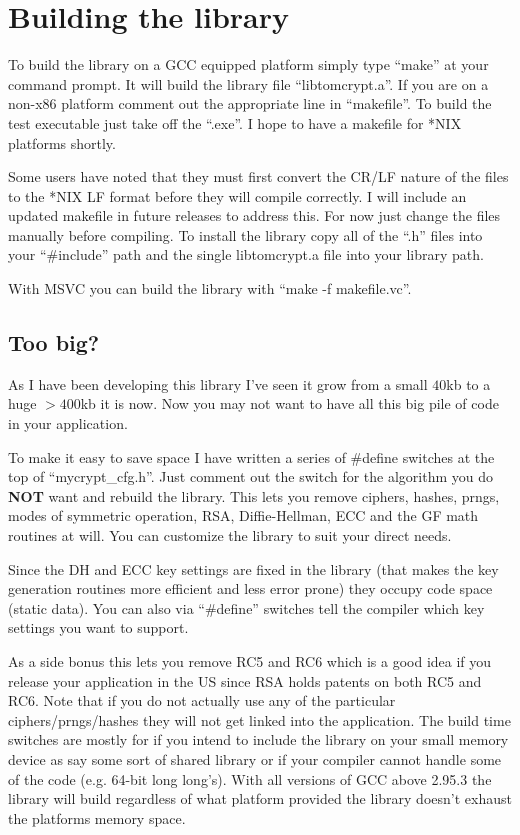 \documentclass{book}
\begin{document}
\section{Building the library}

To build the library on a GCC equipped platform simply type ``make'' at your command prompt.  It will build the library
file ``libtomcrypt.a''.  If you are on a non-x86 platform comment out the appropriate line in ``makefile''.  To build the
test executable just take off the ``.exe''.  I hope to have a makefile for *NIX platforms shortly.

Some users have noted that they must first convert the CR/LF nature of the files to the *NIX LF format before they will
compile correctly.  I will include an updated makefile in future releases to address this.  For now just change the files
manually before compiling.  To install the library copy all of the ``.h'' files into your ``\#include'' path and the 
single libtomcrypt.a file into your library path.

With MSVC you can build the library with ``make -f makefile.vc''.

\subsection{Too big?}
As I have been developing this library I've seen it grow from a small $40$kb to a huge $>400$kb it is now.  Now you may not want
to have all this big pile of code in your application.

To make it easy to save space I have written a series of \#define switches at the top of ``mycrypt\_cfg.h''.  Just comment out the
switch for the algorithm you do {\bf NOT} want and rebuild the library.  This lets you remove ciphers, hashes, prngs, modes of
symmetric operation, RSA, Diffie-Hellman, ECC and the GF math routines at will.  You can customize the library to suit your 
direct needs.  

Since the DH and ECC key settings are fixed in the library (that makes the key generation routines more efficient and less
error prone) they occupy code space (static data).  You can also via ``\#define'' switches tell the compiler which
key settings you want to support.

As a side bonus this lets you remove RC5 and RC6 which is a good idea if you release your application in the US since RSA holds
patents on both RC5 and RC6.  Note that if you do not actually use any of the particular ciphers/prngs/hashes they will not get 
linked into the application.  The build time switches are mostly for if you intend to include the library on your small memory device
as say some sort of shared library or if your compiler cannot handle some of the code (e.g. 64-bit long long's).  With all versions of
GCC above 2.95.3 the library will build regardless of what platform provided the library doesn't exhaust the platforms memory space.
\end{document}
